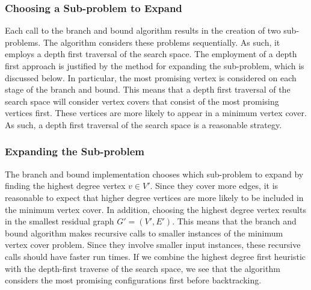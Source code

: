 \documentclass{sig-alternate-05-2015}
\begin{document}
\subsubsection{Choosing a Sub-problem to Expand}
Each call to the branch and bound algorithm results in the creation of two sub-problems. The algorithm considers these problems sequentially. As such, it employs a depth first traversal of the search space. The employment of a depth first approach is justified by the method for expanding the sub-problem, which is discussed below. In particular, the most promising vertex is considered on each stage of the branch and bound. This means that a depth first traversal of the search space will consider vertex covers that consist of the most promising vertices first. These vertices are more likely to appear in a minimum vertex cover. As such, a depth first traversal of the search space is a reasonable strategy.

\subsubsection{Expanding the Sub-problem}
The branch and bound implementation chooses which sub-problem to expand by finding the highest degree vertex $v \in V'$. Since they cover more edges, it is reasonable to expect that higher degree vertices are more likely to be included in the minimum vertex cover. In addition, choosing the highest degree vertex results in the smallest residual graph $G'=(V',E')$. This means that the branch and bound algorithm makes recursive calls to smaller instances of the minimum vertex cover problem. Since they involve smaller input instances, these recursive calls should have faster run times. If we combine the highest degree first heuristic with the depth-first traverse of the search space, we see that the algorithm considers the most promising configurations first before backtracking.
\end{document}
